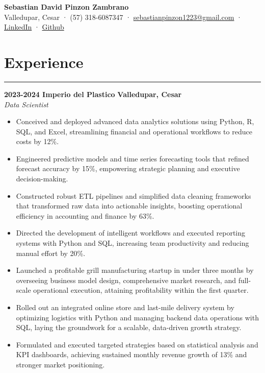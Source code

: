 \documentclass[9pt,a4paper]{article}
\newcommand{\cvevent}[4]{%
  {\noindent \textbf{#1 #2} \hfill \textbf{#3}\\%
   \textit{#4}\\[0pt]}%
}
\begin{document}
\begin{center}
    \textbf{\LARGE Sebastian David Pinzon Zambrano} \\
    Valledupar, Cesar · (57) 318-6087347 · \href{mailto:sebastianpinzon1223@gmail.com}{sebastianpinzon1223@gmail.com} ·
    \href{https://www.linkedin.com/in/sebastiandpinzon/?locale=en_US}{LinkedIn} · \href{https://github.com/Ares-Infenus}{Github}
\end{center}
\vspace{-1em}
\vspace{-\baselineskip}
\section*{Experience}
\vspace{-\baselineskip}
\noindent\rule{\linewidth}{0.5pt}

\cvevent{2023-2024}{Imperio del Plastico}{Valledupar, Cesar}{Data Scientist}
\vspace{-\baselineskip}
\begin{itemize}[noitemsep, topsep=0pt]
    \item Conceived and deployed advanced data analytics solutions using Python, R, SQL, and Excel, streamlining financial and operational workflows to reduce costs by 12\%.
    \item Engineered predictive models and time series forecasting tools that refined forecast accuracy by 15\%, empowering strategic planning and executive decision-making.
    \item Constructed robust ETL pipelines and simplified data cleaning frameworks that transformed raw data into actionable insights, boosting operational efficiency in accounting and finance by 63\%.
    \item Directed the development of intelligent workflows and executed reporting systems with Python and SQL, increasing team productivity and reducing manual effort by 20\%.
    \item Launched a profitable grill manufacturing startup in under three months by overseeing business model design, comprehensive market research, and full-scale operational execution, attaining profitability within the first quarter.
    \item Rolled out an integrated online store and last-mile delivery system by optimizing logistics with Python and managing backend data operations with SQL, laying the groundwork for a scalable, data-driven growth strategy.
    \item Formulated and executed targeted strategies based on statistical analysis and KPI dashboards, achieving sustained monthly revenue growth of 13\% and stronger market positioning.
\end{itemize}
\vspace{-\baselineskip}
\end{document}
